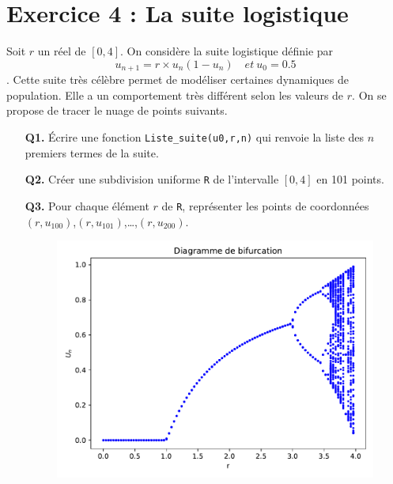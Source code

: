 \documentclass[a4paper,11pt]{article}
\theoremstyle{mytheor}
\begin{document}
\section*{Exercice 4 : La suite logistique}
Soit $r$ un réel de $[0,4]$. On considère la suite logistique définie par
$$u_{n+1}=r \times u_n(1-u_n)  \quad et \ u_0= 0.5$$.
Cette suite très célèbre permet de modéliser certaines dynamiques de population. Elle a un comportement très différent selon les valeurs de $r$. On se propose de tracer le nuage de points suivants.
\begin{itemize}
\item[\textbf{Q1.}] Écrire une fonction \verb|Liste_suite(u0,r,n)| qui renvoie la liste des $n$ premiers termes de la suite.

\item[\textbf{Q2.}] Créer une subdivision uniforme \verb|R| de l'intervalle $[0,4]$ en 101 points.
\item[\textbf{Q3.}] Pour chaque élément $r$ de \verb|R|, représenter les points de coordonnées $(r, u_{100})$,$(r, u_{101})$,\dots,$(r, u_{200})$.
\begin{figure}[th!]
\centering
\includegraphics[width=0.9\linewidth]{scripts/bifurcation}
\label{fig:bifurcation}
\end{figure}

\end{itemize}

\end{document}

